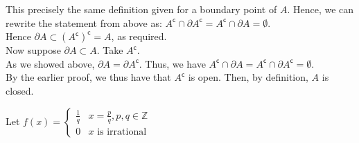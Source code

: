 \documentclass[12pt]{article}
\newenvironment{problem}[2][Problem]{\begin{trivlist}
\item[\hskip \labelsep {\bfseries #1}\hskip \labelsep {\bfseries #2.}]}{\end{trivlist}}
\begin{document}
This precisely the same definition given for a boundary point of $A$. Hence, we can rewrite the statement from above as: $A^\mathsf{c} \cap \partial A^\mathsf{c} = A^\mathsf{c} \cap \partial A = \emptyset$.\\

Hence $\partial A \subset (A^\mathsf{c})^\mathsf{c} = A$, as required.\\

Now suppose $\partial A \subset A$. Take $A^\mathsf{c}$.\\

As we showed above, $\partial A = \partial A^\mathsf{c}$. Thus, we have $A^\mathsf{c} \cap \partial A = A^\mathsf{c} \cap \partial A^\mathsf{c} = \emptyset$.\\

By the earlier proof, we thus have that $A^\mathsf{c}$ is open. Then, by definition, $A$ is closed.

\begin{problem}{3}
\end{problem}

\begin{problem}{4}
\end{problem}

\begin{problem}{5}
\end{problem}

Let $f(x) = \begin{cases} 
      \frac{1}{q} & x = \frac{p}{q}, p, q \in \mathbb{Z} \\
      0 & x \text{ is irrational}
   \end{cases}$
\end{document}
